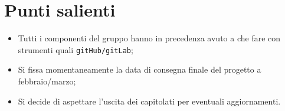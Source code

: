 \documentclass[11pt]{article}
\begin{document}
	\newpage

	\section{Punti salienti}
		\begin{itemize}
			\item Tutti i componenti del gruppo hanno in precedenza avuto a che fare con strumenti quali
			\texttt{gitHub/gitLab};
			\item Si fissa momentaneamente la data di consegna finale del progetto a febbraio/marzo;
			\item Si decide di aspettare l'uscita dei capitolati per eventuali aggiornamenti.
		\end{itemize}
		
\end{document}
